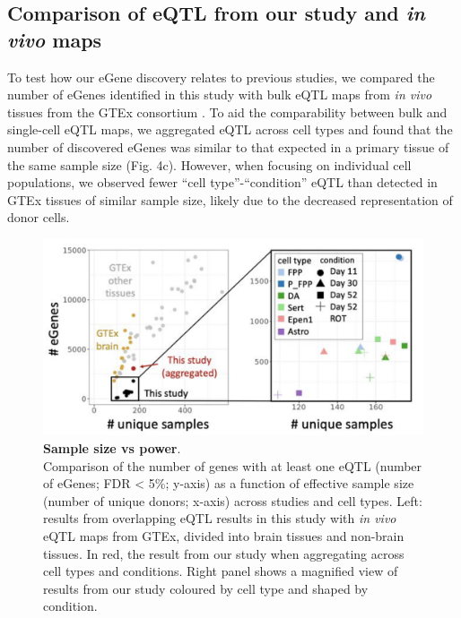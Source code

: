 \subsection{Comparison of eQTL from our study and \textit{in vivo} maps}

To test how our eGene discovery relates to previous studies, we compared the number of eGenes identified in this study with bulk eQTL maps from \textit{in vivo} tissues from the GTEx consortium \cite{gtex2017genetic}. 
To aid the comparability between bulk and single-cell eQTL maps,
we aggregated eQTL across cell types and found that the number of discovered eGenes
was similar to that expected in a primary tissue of the same sample size (Fig. 4c). 
However, when focusing on individual cell populations, we observed fewer “cell type”-“condition” eQTL than detected in GTEx tissues of similar sample size, likely due to the decreased representation of donor cells.\\

\begin{figure}[h]
\centering
\includegraphics[width=16cm]{Chapter5/Fig/neuroseq_eqtl_gtex_scatterplot.png}
\caption[Sample size vs power]{\textbf{Sample size vs power}.\\
Comparison of the number of genes with at least one eQTL (number of eGenes; FDR < 5\%; y-axis) as a function of effective sample size (number of unique donors; x-axis) across studies and cell types. 
Left: results from overlapping eQTL results in this study with \textit{in vivo} eQTL maps from GTEx, divided into brain tissues and non-brain tissues. 
In red, the result from our study when aggregating across cell types and conditions. 
Right panel shows a magnified view of results from our study coloured by cell type and shaped by condition.}
\label{fig:neuroseq_and_gtex_power}
\end{figure}

